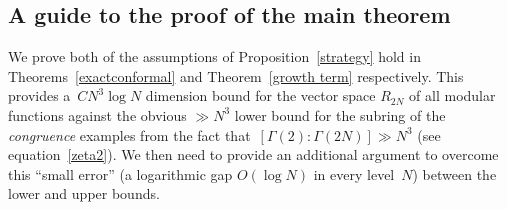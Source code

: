 \documentclass[10pt]{amsart}
\theoremstyle{remark}
\numberwithin{equation}{subsection}
\begin{document}
\subsection{A guide to the  proof of the main theorem}



We prove both of the assumptions of Proposition~\ref{strategy} hold in
Theorems~\ref{exactconformal} and
Theorem~\ref{growth term} respectively. This provides a~$CN^3 \log{N}$ dimension bound 
for the vector space $R_{2N}$ of all modular functions against the obvious $\gg N^3$ lower bound for the subring of the \emph{congruence} examples from the
fact that~$[\Gamma(2):\Gamma(2N)] \gg N^3$ (see equation~\ref{zeta2}).
We then need to provide an additional argument to overcome this ``small error''
(a logarithmic gap $O(\log{N})$ in every level~$N$) between the lower
and upper bounds. 
\end{document}
